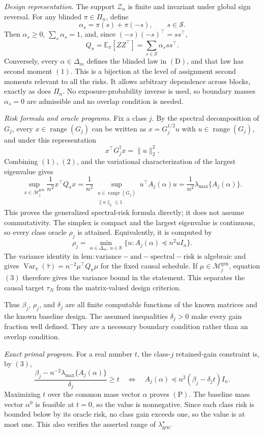\textit{Design representation.}
The support \(\mathcal Z_n\) is finite and invariant under global sign reversal. For any blinded \(\pi\in\Pi_n\), define
\[
\alpha_s=\pi(s)+\pi(-s),\qquad s\in\mathscr S.
\]
Then \(\alpha_s\ge0\), \(\sum_s\alpha_s=1\), and, since \((-s)(-s)^\top=ss^\top\),
\[
Q_\pi=\mathbb E_\pi[ZZ^\top]
=\sum_{s\in\mathscr S}\alpha_sss^\top.
\tag{1}
\]
Conversely, every \(\alpha\in\Delta_m\) defines the blinded law in \((\mathrm D)\), and that law has second moment \((1)\). This is a bijection at the level of assignment second moments relevant to all the risks. It allows arbitrary dependence across blocks, exactly as does \(\Pi_n\). No exposure-probability inverse is used, so boundary masses \(\alpha_s=0\) are admissible and no overlap condition is needed.

\textit{Risk formula and oracle programs.}
Fix a class \(j\). By the spectral decomposition of \(G_j\), every \(x\in\operatorname{range}(G_j)\) can be written as \(x=G_j^{1/2}u\) with \(u\in\operatorname{range}(G_j)\), and under this representation
\[
x^\top G_j^\dagger x=\|u\|_2^2.
\tag{2}
\]
Combining \((1)\), \((2)\), and the variational characterization of the largest eigenvalue gives
\[
\sup_{x\in\mathcal M_j^{\mathrm{gen}}}
\frac1{n^2}x^\top Q_\pi x
=\frac1{n^2}
\sup_{\substack{u\in\operatorname{range}(G_j)\\\|u\|_2\le1}}
u^\top A_j(\alpha)u
=\frac1{n^2}\lambda_{\max}\{A_j(\alpha)\}.
\tag{3}
\]
This proves the generalized spectral-risk formula directly; it does not assume commutativity. The simplex is compact and the largest eigenvalue is continuous, so every class oracle \(\rho_j\) is attained. Equivalently, it is computed by
\[
\rho_j
=\min_{\alpha\in\Delta_m,\ u\in\mathbb R}
\{u:A_j(\alpha)\preceq n^2uI_n\}.
\tag{4}
\]
The variance identity in \(\mathrm{lem:variance-and-spectral-risk}\) is algebraic and gives \(\operatorname{Var}_\pi(\widehat\tau)=n^{-2}\mu^\top Q_\pi\mu\) for the fixed causal schedule. If \(\mu\in\mathcal M_j^{\mathrm{gen}}\), equation \((3)\) therefore gives the variance bound in the statement. This separates the causal target \(\tau_N\) from the matrix-valued design criterion.

Thus \(\beta_j\), \(\rho_j\), and \(\delta_j\) are all finite computable functions of the known matrices and the known baseline design. The assumed inequalities \(\delta_j>0\) make every gain fraction well defined. They are a necessary boundary condition rather than an overlap condition.

\textit{Exact primal program.}
For a real number \(t\), the class-\(j\) retained-gain constraint is, by \((3)\),
\[
\frac{\beta_j-n^{-2}\lambda_{\max}\{A_j(\alpha)\}}{\delta_j}\ge t
\quad\Longleftrightarrow\quad
A_j(\alpha)\preceq n^2(\beta_j-\delta_jt)I_n.
\tag{5}
\]
Maximizing \(t\) over the common mass vector \(\alpha\) proves \((\mathrm P)\). The baseline mass vector \(\alpha^0\) is feasible at \(t=0\), so the value is nonnegative. Since each class risk is bounded below by its oracle risk, no class gain exceeds one, so the value is at most one. This also verifies the asserted range of \(\lambda_{\mathrm{gen}}^\star\).

